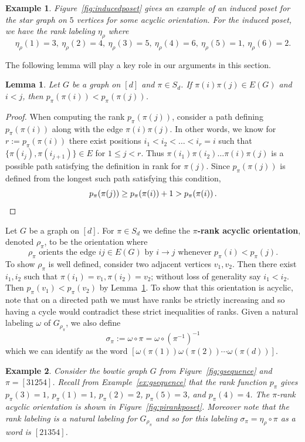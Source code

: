 \documentclass[11pt]{amsart}
\newtheorem{lemma}[theorem]{Lemma}
\newtheorem{exam}{Example}
\newenvironment{example}{\begin{exam}\sf}{\end{exam}}
\newcommand\Def[1]{{\bf #1}}
\newcommand{\rk}[1][\pi]{p_{#1}}
\begin{document}
\begin{example}
    Figure~\ref{fig:inducedposet} gives an example of an induced poset for the star graph on $5$ vertices for
some acyclic orientation. For the induced poset, we have the rank labeling $\eta_\rho$ where 
    \[
        \eta_\rho(1)=3, \ \eta_\rho(2)=4, \ \eta_\rho(3)=5, \ \eta_\rho(4)=6, \ \eta_\rho(5)=1, \ \eta_\rho(6)=2.
    \]
\end{example}

The following lemma will play a key role in our arguments in this section.
\begin{lemma}\label{lem:edgerank}
    Let $G$ be a graph on $[d]$ and $\pi \in S_d$. If $\pi(i) \pi(j) \in E(G)$ and $i <j$, then $\rk(\pi(i))<\rk(\pi(j))$.
\end{lemma}
\begin{proof}
    When computing the rank $\rk(\pi(j))$, consider a path defining $\rk(\pi(i))$ along with the edge $\pi(i)\pi(j)$. 
    In other words, we know for $r := \rk(\pi(i))$ there exist positions $i_1 < i_2 < \dots < i_r = i$ such that $\{\pi(i_j), \pi(i_{j+1}) \} \in E$ for $1 \le j < r$.
    Thus $\pi(i_1) \pi(i_2) \ldots \pi(i) \pi(j)$ is a possible path satisfying the definition in rank for $\pi(j)$. 
    Since $\rk(\pi(j))$ is defined from the longest such path satisfying this condition, 
    \[
        \rk(\pi(j)) \geq \rk(\pi(i))+1 > \rk(\pi(i)) \, . \qedhere 
    \] 
\end{proof}

Let $G$ be a graph on $[d]$. 
For $\pi \in S_d$ we define the \Def{$\pi$-rank acyclic orientation}, denoted $\rho_\pi$, to be the orientation where 
\[
    \rho_\pi \text{ orients the edge } ij \in E(G) \text{ by } i \to j \text{ whenever } \rk(i) < \rk(j).
\]
To show $\rho_\pi$ is well defined, consider two adjacent vertices $v_1,v_2$. 
Then there exist $i_1,i_2$ such that $\pi(i_1) = v_1, \pi(i_2) = v_2$; without loss of generality say $i_1 < i_2$. 
Then $\rk(v_1) < \rk(v_2)$ by Lemma~\ref{lem:edgerank}.
To show that this orientation is acyclic, note that on a directed path we must have ranks be strictly increasing and so having a cycle would contradict these strict inequalities of ranks.
Given a natural labeling $\omega$ of $G_{\rho_\pi}$, we also define 
\[
    \sigma_\pi := \omega \circ \pi = \omega \circ (\pi^{-1})^{-1}
\]
which we can identify as the word $[\omega(\pi(1)) \omega(\pi(2)) \cdots \omega(\pi(d))]$.

\begin{example}
    Consider the bowtie graph $G$ from Figure~\ref{fig:gsequence} and $\pi = [31254]$. Recall from Example~\ref{ex:gsequence} that the rank function $\rk$ gives $\rk(3) = 1$, $\rk(1)=1$, $\rk(2)=2$, $\rk(5)=3$, and $\rk(4)=4$. The $\pi$-rank acyclic orientation is shown in Figure~\ref{fig:pirankposet}. Moreover note that the rank labeling is a natural labeling for $G_{\rho_\pi}$ and so for this labeling $\sigma_\pi = \eta_\rho \circ \pi$ as a word is $[21354]$.
\end{example}
\end{document}
